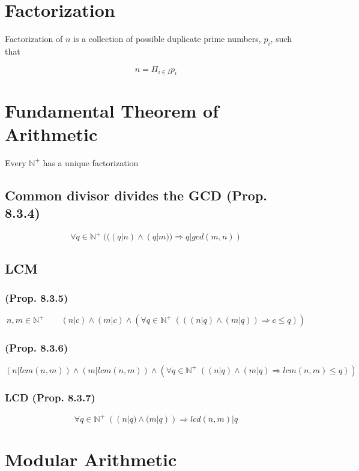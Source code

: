 \documentclass[12pt]{article}
\begin{document}
\begin{spacing}{1.5}
\section{Factorization}

Factorization of $n$ is a collection of possible duplicate prime numbers, $p_i$, such that

$$n = \Pi_{i \in I} p_i$$

\section{Fundamental Theorem of Arithmetic}

Every $\mathbb{N}^+$ has a unique factorization

\subsection{Common divisor divides the GCD (Prop. 8.3.4)}
$$\forall q \in \mathbb{N}^+ \; (((q | n) \wedge (q | m)) \Rightarrow q | gcd(m, n))$$

\subsection{LCM}

\subsubsection{(Prop. 8.3.5)}

$$n, m \in \mathbb{N}^+ \qquad 
(n | c) \wedge (m | c) \wedge
(\forall q \in \mathbb{N}^+ \; (((n|q) \wedge (m|q)) \Rightarrow c \le q))$$


\subsubsection{(Prop. 8.3.6)}

$$(n | lcm(n, m)) \wedge (m | lcm(n, m)) \wedge 
(\forall q \in \mathbb{N}^+ \; ((n|q) \wedge (m|q) \Rightarrow lcm(n, m) \le q))$$


\subsubsection{LCD (Prop. 8.3.7)}

$$\forall q \in \mathbb{N}^+ \; ((n|q) \wedge (m|q)) \Rightarrow lcd(n, m) | q$$

\section{Modular Arithmetic}


\end{spacing}
\end{document}
